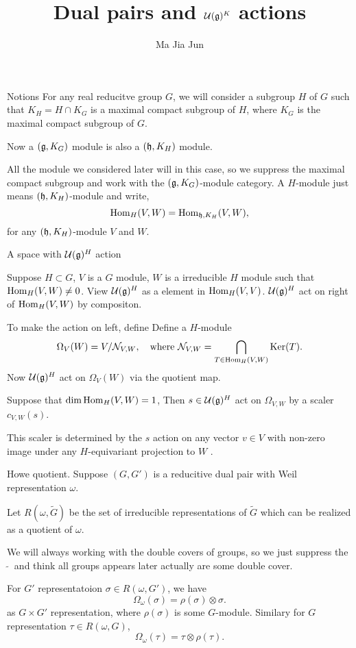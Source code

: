 \documentclass{beamer}
\begin{document}


\title{Dual pairs and $\mathcal{U}(\mathfrak{g})^K$ actions}
\author{Ma Jia Jun}

\begin{frame}[plain]
  \titlepage
\end{frame}

\begin{frame}{Notions}
For any real reducitve group $G$, 
we will consider a subgroup $H$ of $G$ such that $K_H = H\cap K_G$ is a maximal 
compact subgroup of $H$, where $K_G$ is the maximal compact subgroup of $G$.

Now a $(\mathfrak{g},K_G)$ module is also a $(\mathfrak{h},K_H)$ module.

All the module we considered later will in this case, 
so we suppress the maximal compact subgroup and work with 
the $(\mathfrak{g},K_G)$-module category.
A $H$-module just means $(\mathfrak{h},K_H)$-module and write,
\[
{\rm Hom}_{H}(V,W) = {\rm Hom}_{\mathfrak{h},K_H}(V,W),
\]
for any $(\mathfrak{h},K_H)$-module $V$ and $W$.
\end{frame}

\begin{frame}{A space with $\mathcal{U}(\mathfrak{g})^H$ action}


Suppose $H\subset G$,  $V$ is a $G$ module, $W$ is a irreducible $H$ module
 such that
${\rm Hom}_{H}(V,W)\neq 0$.
View $\mathcal{U}(\mathfrak{g})^H$ as a element in ${\rm Hom}_H(V,V)$. 
$\mathcal{U}(\mathfrak{g})^H$ act on right 
of ${\rm Hom}_H(V,W)$ by compositon.

To make the action on left, define
Define a $H$-module \[
\Omega_V(W) = V / \mathcal{N}_{V,W},
\quad \text{where }
\mathcal{N}_{V,W} = \bigcap_{T\in {\rm Hom}_H(V,W)}{\rm Ker}(T).
\]
Now $\mathcal{U}(\mathfrak{g})^H$ act on $\Omega_V(W)$ via the quotient map.

\begin{lemma}
Suppose that $\dim {\rm Hom}_{H}(V,W)=1$,
Then $s \in \mathcal{U}(\mathfrak{g})^H$ act on $\Omega_{V,W}$ by a  scaler $c_{V,W}(s)$.
\end{lemma}
\rmk This scaler is determined by the $s$ action on any vector $v\in V$ with 
non-zero image under any $H$-equivariant projection to $W$ .

\end{frame}


\begin{frame}{Howe quotient.}
Suppose $(G,G')$ is a reducitive dual pair with 
Weil representation $\omega$.

Let $R(\omega,\widetilde{G})$
be the set of irreducible  representations of $\widetilde{G}$
which can be realized as a quotient of $\omega$.

We will always working with the double covers of groups, so
we just suppress the $\widetilde{\ \  }$ and think all groups 
appears later actually are some double cover.

For $G'$ representatoion $\sigma \in R(\omega,G')$, we have
\[
 \Omega_\omega(\sigma) = \rho(\sigma)\otimes \sigma.
\]
 as $G\times G'$ representation, where $\rho(\sigma)$ is some $G$-module.
Similary for $G$ representation $\tau\in R(\omega,G)$,
\[
 \Omega_\omega(\tau) = \tau\otimes \rho(\tau).
\]

\end{frame}
\end{document}
